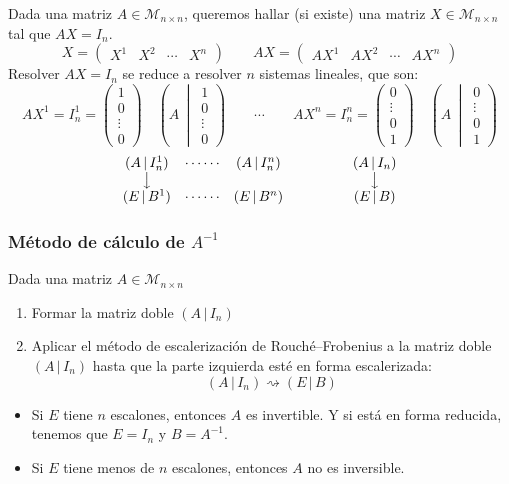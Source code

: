 \documentclass[11pt,a4paper]{article}
\newcommand{\M}{\mathcal{M}}
\begin{document}
Dada una matriz $A\in\M_{n\times n}$, queremos hallar (si existe) una matriz $X\in\M_{n\times n}$ tal que $AX=I_n$.
\[
X=\begin{pmatrix} X^1 & X^2 & \cdots & X^n\end{pmatrix}
\qquad
AX=\begin{pmatrix} AX^1 & AX^2 & \cdots & AX^n\end{pmatrix}
\]
Resolver $AX=I_n$ se reduce a resolver $n$ sistemas lineales, que son:
\[
AX^1=I_n^1=\begin{pmatrix}1\\0\\\vdots\\0\end{pmatrix}\quad\left(A\,\middle|\,\begin{matrix}1\\0\\\vdots\\0\end{matrix}\right)
\qquad\cdots\qquad
AX^n=I_n^n=\begin{pmatrix}0\\\vdots\\0\\1\end{pmatrix}\quad\left(A\,\middle|\,\begin{matrix}0\\\vdots\\0\\1\end{matrix}\right)
\]
\[
\begin{array}{ccc}
(A\,|\,I_n^1) & \cdots\cdots & (A\,|\,I_n^n)\\
\big\downarrow & & \\
(E\,|\,B^1) & \cdots\cdots & (E\,|\,B^n)
\end{array}
\qquad\qquad
\begin{array}{c}
(A\,|\,I_n)\\ \big\downarrow\\ (E\,|\,B)
\end{array}
\]

\subsubsection*{Método de cálculo de \texorpdfstring{$A^{-1}$}{A-1}}

Dada una matriz $A\in\M_{n\times n}$
\begin{enumerate}[label=\arabic*.]
  \item Formar la matriz doble $(A\,|\,I_n)$
  \item Aplicar el método de escalerización de Rouché--Frobenius a la matriz doble $(A\,|\,I_n)$ hasta que la parte izquierda esté en forma escalerizada:
  \[
  (A\,|\,I_n)\rightsquigarrow(E\,|\,B)
  \]
\end{enumerate}
\begin{itemize}
  \item Si $E$ tiene $n$ escalones, entonces $A$ es invertible. Y si está en forma reducida, tenemos que $E=I_n$ y $B=A^{-1}$.
  \item Si $E$ tiene menos de $n$ escalones, entonces $A$ no es inversible.
\end{itemize}
\end{document}
